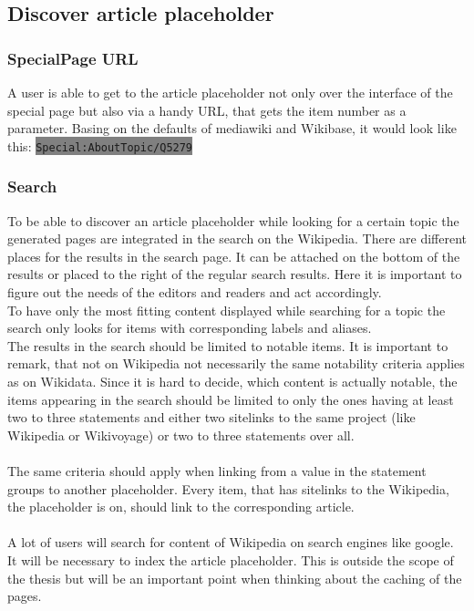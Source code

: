 \documentclass[11pt]{article}
\begin{document}
\subsection{Discover article placeholder}
\subsubsection{SpecialPage URL}
A user is able to get to the article placeholder not only over the interface of the special page but also via a handy URL, that gets the item number as a parameter. Basing on the defaults of mediawiki and Wikibase, it would look like this: \colorbox{Gray}{\lstinline[basicstyle=\ttfamily\color{white}]|Special:AboutTopic/Q5279|} \\
\subsubsection{Search}
To be able to discover an article placeholder while looking for a certain topic the generated pages are integrated in the search on the Wikipedia. There are different places for the results in the search page. It can be attached on the bottom of the results or placed to the right of the regular search results. Here it is important to figure out the needs of the editors and readers and act accordingly. \\
To have only the most fitting content displayed while searching for a topic the search only looks for items with corresponding labels and aliases. \\
The results in the search should be limited to notable items. It is important to remark, that not on Wikipedia not necessarily the same notability criteria applies as on Wikidata. Since it is hard to decide, which content is actually notable, the items appearing in the search should be limited to only the ones having at least two to three statements and either two sitelinks to the same project (like Wikipedia or Wikivoyage) or two to three statements over all. \\
\\
The same criteria should apply when linking from a value in the statement groups to another placeholder. Every item, that has sitelinks to the Wikipedia, the placeholder is on, should link to the corresponding article. \\
\\
A lot of users will search for content of Wikipedia on search engines like google. It will be necessary to index the article placeholder. This is outside the scope of the thesis but will be an important point when thinking about the caching of the pages. 
\end{document}
